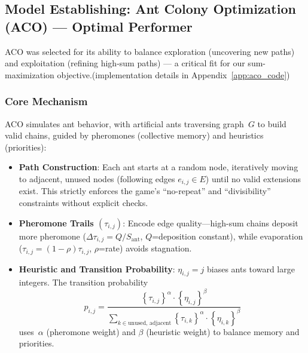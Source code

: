 \documentclass[twocolumn, a4paper]{article}
\begin{document}
\subsection{Model Establishing: Ant Colony Optimization (ACO) --- Optimal Performer}
ACO was selected for its ability to balance exploration (uncovering new paths) and exploitation (refining high-sum paths) --- a critical fit for our sum-maximization objective.(implementation details in Appendix~\ref{app:aco_code})
\subsubsection{Core Mechanism}
ACO simulates ant behavior, with artificial ants traversing graph $G$ to build valid chains, guided by pheromones (collective memory) and heuristics (priorities):
\begin{itemize}
    \item \textbf{Path Construction}: Each ant starts at a random node, iteratively moving to adjacent, unused nodes (following edges $e_{i,j} \in E$) until no valid extensions exist. This strictly enforces the game's ``no-repeat'' and ``divisibility'' constraints without explicit checks.
    \item \textbf{Pheromone Trails $(\tau_{i,j})$}: Encode edge quality—high-sum chains deposit more pheromone (\(\Delta \tau_{i,j}=Q/S_{\text{ant}}\), $Q$=deposition constant), while evaporation (\(\tau_{i,j}=(1-\rho)\tau_{i,j}\), \(\rho\)=rate) avoids stagnation.
    \item \textbf{Heuristic and Transition Probability}: $\eta_{i,j}=j$ biases ants toward large integers. The transition probability \[p_{i,j} = \frac{ \left\{ \tau_{i,j} \right\} ^{\alpha} \cdot \left\{ \eta_{i,j} \right\} ^{\beta} }{ \sum_{k \in \text{unused, adjacent}} \left\{ \tau_{i,k} \right\} ^{\alpha} \cdot \left\{ \eta_{i,k} \right\} ^{\beta} }\] uses $\alpha$ (pheromone weight) and $\beta$ (heuristic weight) to balance memory and priorities.
\end{itemize}
\end{document}

